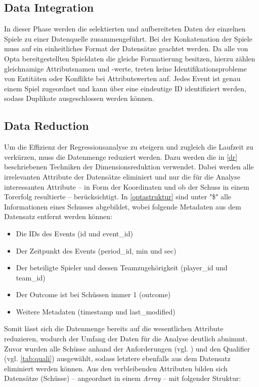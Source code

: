 \subsection{Data Integration}
\label{datai}
In dieser Phase werden die selektierten und aufbereiteten Daten der einzelnen Spiele zu einer Datenquelle zusammengeführt. Bei der Konkatenation der Spiele muss auf ein einheitliches Format der Datensätze geachtet werden. Da alle von Opta bereitgestellten Spieldaten die gleiche Formatierung besitzen, hierzu zählen gleichnamige Attributsnamen und -werte, treten keine Identifikationsprobleme von Entitäten oder Konflikte bei Attributswerten auf. Jedes Event ist genau einem Spiel zugeordnet und kann über eine eindeutige ID identifiziert werden, sodass Duplikate ausgeschlossen werden können.
\newpage

\subsection{Data Reduction}
\label{datar}
Um die Effizienz der Regressionsanalyse zu steigern und zugleich die Laufzeit zu verkürzen, muss die Datenmenge reduziert werden. Dazu werden die in \vref{dr} beschriebenen Techniken der Dimensionsreduktion verwendet. Dabei werden alle irrelevanten Attribute der Datensätze eliminiert und nur die für die Analyse interessanten Attribute -- in Form der Koordinaten und ob der Schuss in einem Torerfolg resultierte -- berücksichtigt. In \vref{optastruktur} sind unter \textsf{"\$"} alle Informationen eines Schusses abgebildet, wobei folgende Metadaten aus dem Datensatz entfernt werden können:

\begin{itemize}
\item Die IDs des Events (\textsf{id} und \textsf{event\_id})
\item Der Zeitpunkt des Events (\textsf{period\_id}, \textsf{min} und \textsf{sec})
\item Der beteiligte Spieler und dessen Teamzugehörigkeit (\textsf{player\_id} und \textsf{team\_id})
\item Der Outcome ist bei Schüssen immer \textsf{1} (\textsf{outcome})
\item Weitere Metadaten (\textsf{timestamp} und \textsf{last\_modified})
\end{itemize}

Somit lässt sich die Datenmenge bereits auf die wesentlichen Attribute reduzieren, wodurch der Umfang der Daten für die Analyse deutlich abnimmt. Zuvor wurden alle Schüsse anhand der Anforderungen (vgl. ) und den Qualifier (vgl. \vref{tab:quali}) ausgewählt, sodass letztere ebenfalls aus dem Datensatz eliminiert werden können. Aus den verbleibenden Attributen bilden sich Datensätze (Schüsse) -- angeordnet in einem \textit{Array} -- mit folgender Struktur:
\newline\enlargethispage{2\baselineskip} 

